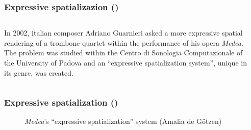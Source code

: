 \setcounter{ms}{0}
\begin{frame}
    \frametitle<+- | alert@+->{Expressive spatializazion ()}

    \begin{columns}[T]
        \begin{column}{0.7\textwidth}
						In 2002, italian composer Adriano Guarnieri asked a more
						expressive spatial rendering of a trombone quartet within the
						performance of his opera \emph{Medea}.
					  The problem was studied within the Centro di Sonologia
						Computazionale of the University of Padova and an ``expressive
						spatialization system'', unique in its genre, was created.
        \end{column}
        \begin{column}{0.3\textwidth}
        \end{column}
    \end{columns}
    
\end{frame}

\begin{frame}
    \frametitle{Expressive spatialization ()}

    \begin{center}
        \begin{figure}
            \begin{center}
            \end{center}
            \caption{\emph{Medea}'s ``expressive spatialization'' system (Amalia de G\"otzen)}
            \label{fig:medea processing}
        \end{figure}
    \end{center}
    
\end{frame}
